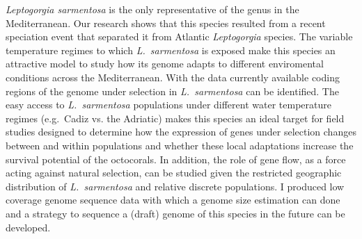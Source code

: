 \documentclass[a4paper,11pt]{article}
\begin{document}
\emph{Leptogorgia sarmentosa} is the only representative of the genus in the Mediterranean. Our research shows that this species resulted from a recent speciation event that separated it from Atlantic \emph{Leptogorgia} species. The variable temperature regimes to which \emph{L.~sarmentosa} is exposed make this species an attractive model to study how its genome adapts to different enviromental conditions across the Mediterranean. With the data currently available coding regions of the genome under selection in \emph{L.~sarmentosa} can be identified. The easy access to \emph{L.~sarmentosa} populations under different water temperature regimes (e.g.~Cadiz vs. the Adriatic) makes this species an ideal target for field studies designed to determine how the expression of genes under selection changes between and within populations and whether these local adaptations increase the survival potential of the octocorals. In addition, the role of gene flow, as a force acting against natural selection, can be studied given the restricted geographic distribution of \emph{L.~sarmentosa} and relative discrete populations. I produced low coverage genome sequence data with which a genome size estimation can done and a strategy to sequence a (draft) genome of this species in the future can be developed.\\

















\newpage

\end{document}
